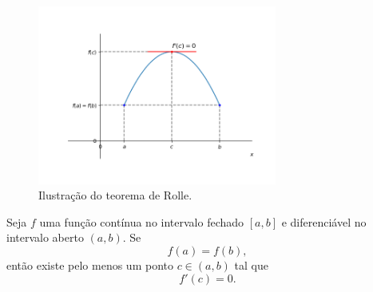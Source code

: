 \begin{figure}[H]
  \centering
  \includegraphics[width=0.7\textwidth]{./cap_apderiv/dados/fig_teo_Rolle/fig_teo_Rolle}
  \caption{Ilustração do teorema de Rolle.}
  \label{fig:teo_Rolle}
\end{figure}

\begin{teo}
  Seja $f$ uma função contínua no intervalo fechado $[a, b]$ e diferenciável no intervalo aberto $(a, b)$. Se
  \begin{equation}
    f(a)=f(b),
  \end{equation}
  então existe pelo menos um ponto $c\in (a, b)$ tal que
  \begin{equation}
    f'(c)=0.
  \end{equation}
\end{teo}

